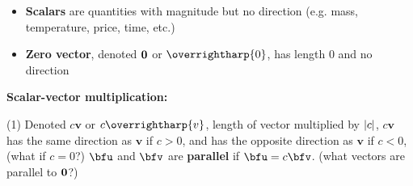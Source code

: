 \documentclass[mathNotesPreamble]{subfiles}
\begin{document}
\begin{defn*}
\begin{itemize}
      \item \textbf{Scalars} are quantities with magnitude but no direction \newline (e.g. mass, temperature, price, time, etc.)
      \item \textbf{Zero vector}, denoted $\mathbf{0}$ or $\overrightharp{0}$, has length $0$ and no direction
    \end{itemize}
  \end{defn*}

  \textbf{Scalar-vector multiplication:}
    \begin{tasks}[label=\textbullet](1)
      \task Denoted $c\mathbf{v}$ or $c\overrightharp{v}$,
      \task length of vector multiplied by ${\left\vert c\right\vert}$,
      \task $c\mathbf v$ has the same direction as $\mathbf v$ if $c>0$, and has the opposite direction as $\mathbf v$ if $c<0$,\newline
            (what if $c=0$?)
      \task $\bfu$ and $\bfv$ are \textbf{parallel} if $\bfu=c\bfv$.\newline
            (what vectors are parallel to $\mathbf{0}$?)
    \end{tasks}
\end{document}
